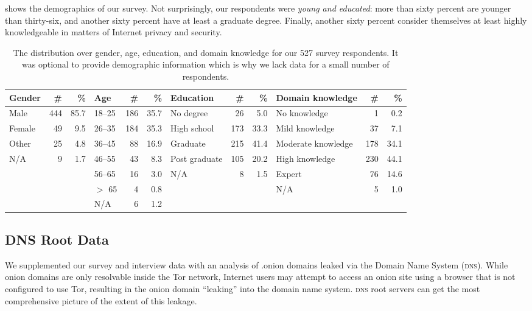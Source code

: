  shows the demographics of our survey.  Not
surprisingly, our respondents were \emph{young and educated}: more than sixty
percent are younger than thirty-six, and another sixty percent have at least a
graduate degree.  Finally, another sixty percent consider themselves at least
highly knowledgeable in matters of Internet privacy and security.

\begin{table*}[t]
	\centering
	\caption{The distribution over gender, age, education, and domain knowledge
	for our 527 survey respondents.  It was optional to provide demographic
	information which is why we lack data for a small number of respondents.}
	\label{tab:survey-demo}
	\begin{tabular}{l r r | l r r | l r r | l r r}
	\toprule
	Gender & \# & \% &
	Age & \# & \% &
	Education & \# & \% &
	Domain knowledge & \# & \% \\
	\midrule
	Male   & 444 & 85.7 & 18--25 & 186 & 35.7 & No degree     &  26 & 5.0  & No knowledge       &   1 & 0.2  \\
	Female &  49 &  9.5 & 26--35 & 184 & 35.3 & High school   & 173 & 33.3 & Mild knowledge     &  37 & 7.1  \\
	Other  &  25 &  4.8 & 36--45 &  88 & 16.9 & Graduate      & 215 & 41.4 & Moderate knowledge & 178 & 34.1 \\
	N/A    &   9 &  1.7 & 46--55 &  43 &  8.3 & Post graduate & 105 & 20.2 & High knowledge     & 230 & 44.1 \\
	       &     &      & 56--65 &  16 &  3.0 & N/A           &   8 &  1.5 & Expert             &  76 & 14.6 \\
	       &     &      & $>$ 65 &   4 &  0.8 &               &     &      & N/A                &   5 &  1.0 \\
	       &     &      & N/A    &   6 &  1.2 &               &     &      &                    &     & \\
	\bottomrule
	\end{tabular}
\end{table*}

\subsection{DNS Root Data}
\label{sec:root-data}

We supplemented our survey and interview data with an analysis of .onion domains
leaked via the Domain Name System (\textsc{dns}).  While onion domains are only
resolvable inside the Tor network, Internet users may attempt to access an onion
site using a browser that is not configured to use Tor, resulting in the onion
domain ``leaking'' into the domain name system.  \textsc{dns} root servers can
get the most comprehensive picture of the extent of this leakage.  

